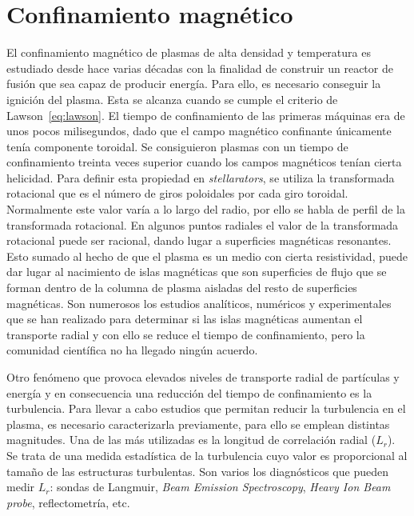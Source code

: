 \section{Confinamiento magnético}\label{sec:confinement}
El confinamiento magnético de plasmas de alta densidad y temperatura es estudiado
desde hace varias décadas con la finalidad de construir un reactor de fusión que sea capaz
de producir energía. Para ello, es necesario conseguir la ignición del plasma. Esta se alcanza
cuando se cumple el criterio de Lawson~\eqref{eq:lawson}.
El tiempo de confinamiento de las primeras máquinas era de unos pocos milisegundos, dado
que el campo magnético confinante únicamente tenía componente toroidal. Se consiguieron
plasmas con un tiempo de confinamiento treinta veces superior cuando los campos magnéticos
tenían cierta helicidad. Para definir esta propiedad en \textit{stellarators}, se utiliza la transformada
rotacional que es el número de giros poloidales por cada giro toroidal. Normalmente este
valor varía a lo largo del radio, por ello se habla de perfil de la transformada rotacional. En
algunos puntos radiales el valor de la transformada rotacional puede ser racional, dando lugar
a superficies magnéticas resonantes. Esto sumado al hecho de que el plasma es un medio con
cierta resistividad, puede dar lugar al nacimiento de islas magnéticas que son superficies de
flujo que se forman dentro de la columna de plasma aisladas del resto de superficies magnéticas.
Son numerosos los estudios analíticos, numéricos y experimentales que se han realizado
para determinar si las islas magnéticas aumentan el transporte radial y con ello se reduce el
tiempo de confinamiento, pero la comunidad científica no ha llegado ningún acuerdo.\par
Otro fenómeno que provoca elevados niveles de transporte radial de partículas y energía
y en consecuencia una reducción del tiempo de confinamiento es la turbulencia. Para llevar a
cabo estudios que permitan reducir la turbulencia en el plasma, es necesario caracterizarla
previamente, para ello se emplean distintas magnitudes. Una de las más utilizadas es la longitud
de correlación radial ($L_r$). Se trata de una medida estadística de la turbulencia cuyo
valor es proporcional al tamaño de las estructuras turbulentas.
Son varios los diagnósticos que pueden medir $L_r$: sondas de Langmuir, \textit{Beam Emission Spectroscopy},
\textit{Heavy Ion Beam probe}, reflectometría, etc.
